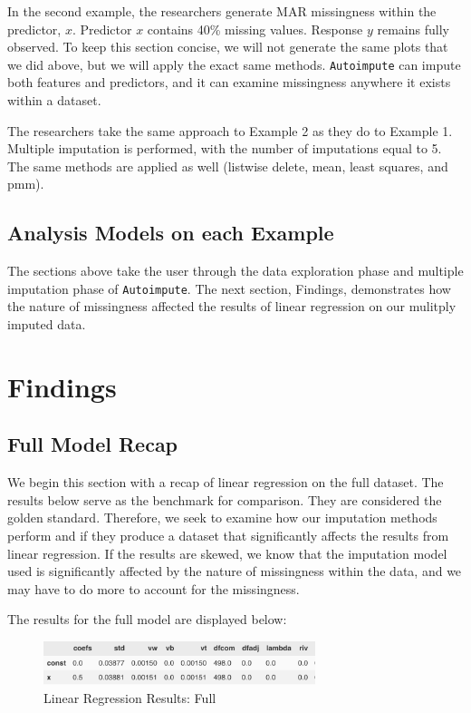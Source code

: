 \documentclass[12pt,oneside]{chicagocapstone}
\begin{document}
In the second example, the researchers generate MAR missingness within
the predictor, \(x\). Predictor \(x\) contains 40\% missing values.
Response \(y\) remains fully observed. To keep this section concise, we
will not generate the same plots that we did above, but we will apply
the exact same methods. \texttt{Autoimpute} can impute both features and
predictors, and it can examine missingness anywhere it exists within a
dataset.

The researchers take the same approach to Example 2 as they do to
Example 1. Multiple imputation is performed, with the number of
imputations equal to 5. The same methods are applied as well (listwise
delete, mean, least squares, and pmm).

\section*{Analysis Models on each
Example}\label{analysis-models-on-each-example}

The sections above take the user through the data exploration phase and
multiple imputation phase of \texttt{Autoimpute}. The next section,
Findings, demonstrates how the nature of missingness affected the
results of linear regression on our mulitply imputed data.

\hypertarget{findings}{\chapter*{Findings}\label{findings}}

\section*{Full Model Recap}\label{full-model-recap}

We begin this section with a recap of linear regression on the full
dataset. The results below serve as the benchmark for comparison. They
are considered the golden standard. Therefore, we seek to examine how
our imputation methods perform and if they produce a dataset that
significantly affects the results from linear regression. If the results
are skewed, we know that the imputation model used is significantly
affected by the nature of missingness within the data, and we may have
to do more to account for the missingness.

The results for the full model are displayed below:
\begin{figure}

{\centering \includegraphics[width=300px]{figure/full-regression} 

}

\caption{Linear Regression Results: Full}\label{fig:full-regression-again}
\end{figure}
\end{document}
